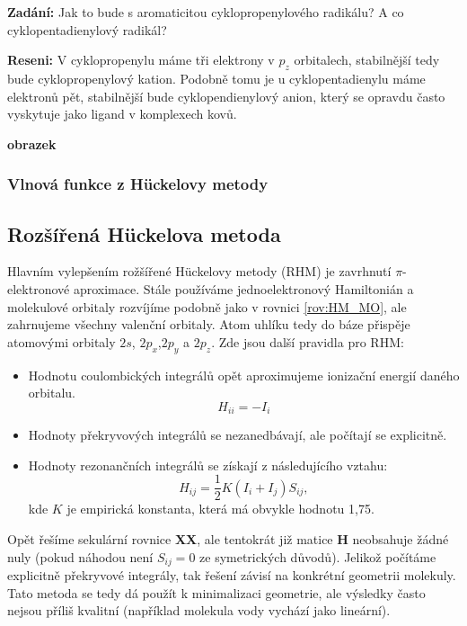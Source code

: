 \begin{priklad}
\textbf{Zadání:} Jak to bude s aromaticitou cyklopropenylového radikálu? A co cyklopentadienylový radikál?

\textbf{Reseni:} V cyklopropenylu máme tři elektrony v $p_z$ orbitalech, stabilnější tedy bude cyklopropenylový kation. Podobně tomu je u cyklopentadienylu máme elektronů pět, stabilnější bude cyklopendienylový anion, který se opravdu často vyskytuje jako ligand v komplexech kovů.
\end{priklad}

\textbf{obrazek}
\bigskip

\subsubsection{Vlnová funkce z H\"uckelovy metody}


\subsection{Rozšířená H\"{u}ckelova metoda}

Hlavním vylepšením rožšířené H\"{u}ckelovy metody (RHM) je zavrhnutí $\pi$-elektronové aproximace.
Stále používáme jednoelektronový Hamiltonián a molekulové orbitaly rozvíjíme podobně jako v rovnici \ref{rov:HM_MO}, ale zahrnujeme všechny valenční orbitaly. Atom uhlíku tedy do báze přispěje atomovými orbitaly $2s$, $2p_x$,$2p_y$ a $2p_z$. 
Zde jsou další pravidla pro RHM:

\begin{itemize}
\item Hodnotu coulombických integrálů opět aproximujeme ionizační energií daného orbitalu.
$$H_{ii}=-I_i$$
\item Hodnoty překryvových integrálů se nezanedbávají, ale počítají se explicitně.
\item Hodnoty rezonančních integrálů se získají z následujícího vztahu:
\begin{equation}
H_{ij}=\frac{1}{2}K(I_i+I_j)S_{ij},
\end{equation}
kde $K$ je empirická konstanta, která má obvykle hodnotu 1,75.
\end{itemize}
Opět řešíme sekulární rovnice \textbf{XX}, ale tentokrát již matice \textbf{H} neobsahuje žádné nuly (pokud náhodou není $S_{ij}=0$ ze symetrických důvodů). Jelikož počítáme explicitně překryvové integrály, tak řešení závisí na konkrétní geometrii molekuly. Tato metoda se tedy dá použít k minimalizaci geometrie, ale výsledky často nejsou příliš kvalitní (například molekula vody vychází jako lineární).

